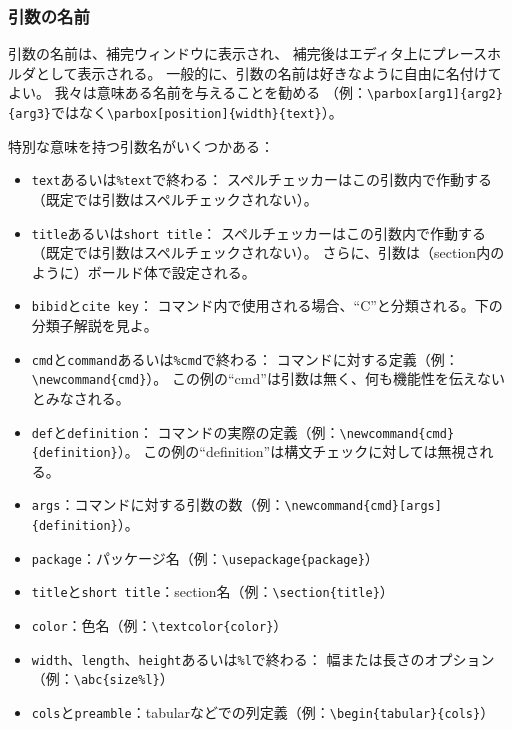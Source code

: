 \subsubsection{引数の名前}

引数の名前は、補完ウィンドウに表示され、
補完後はエディタ上にプレースホルダとして表示される。
一般的に、引数の名前は好きなように自由に名付けてよい。
我々は意味ある名前を与えることを勧める
（例：\verb+\parbox[arg1]{arg2}{arg3}+ではなく\verb+\parbox[position]{width}{text}+）。

特別な意味を持つ引数名がいくつかある：

\begin{itemize}
\item
  \verb+text+あるいは\verb+%text+で終わる：
  スペルチェッカーはこの引数内で作動する（既定では引数はスペルチェックされない）。
\item
  \verb+title+あるいは\verb+short title+：
  スペルチェッカーはこの引数内で作動する（既定では引数はスペルチェックされない）。
  さらに、引数は（section内のように）ボールド体で設定される。
\item
  \verb+bibid+と\verb+cite key+：
  コマンド内で使用される場合、``C''と分類される。下の分類子解説を見よ。
\item
  \verb+cmd+と\verb+command+あるいは\verb+%cmd+で終わる：
  コマンドに対する定義（例：\verb+\newcommand{cmd}+）。
  この例の``cmd''は引数は無く、何も機能性を伝えないとみなされる。
\item
  \verb+def+と\verb+definition+：
  コマンドの実際の定義（例：\verb+\newcommand{cmd}{definition}+）。
  この例の``definition''は構文チェックに対しては無視される。
\item
  \verb+args+：コマンドに対する引数の数（例：\verb+\newcommand{cmd}[args]{definition}+）。
\item
  \verb+package+：パッケージ名（例：\verb+\usepackage{package}+）
\item
  \verb+title+と\verb+short title+：section名（例：\verb+\section{title}+）
\item
  \verb+color+：色名（例：\verb+\textcolor{color}+）
\item
  \verb+width+、\verb+length+、\verb+height+あるいは\verb+%l+で終わる：
  幅または長さのオプション（例：\verb+\abc{size%l}+）
\item
  \verb+cols+と\verb+preamble+：tabularなどでの列定義（例：\verb+\begin{tabular}{cols}+）

\end{itemize}
